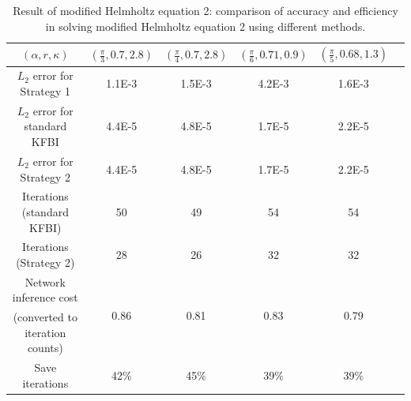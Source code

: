 \documentclass{article}
\begin{document}
\begin{table}[ht]
    \centering
    \begin{tabular}{|c|c|c|c|c|c|} \hline 
         $(\alpha, r, \kappa) $ & $(\frac{\pi}{3}, 0.7, 2.8)$ & $(\frac{\pi}{4}, 0.7, 2.8)$ & $(\frac{\pi}{6}, 0.71, 0.9)$ & $(\frac{\pi}{5}, 0.68, 1.3)$ \\ \hline 
         $L_2$ error for Strategy 1 & 1.1E-3 & 1.5E-3& 4.2E-3 & 1.6E-3 \\ \hline
         $L_{2}$ error for standard KFBI & 4.4E-5 & 4.8E-5 & 1.7E-5 & 2.2E-5 \\ \hline
         $L_{2}$ error for Strategy 2 & 4.4E-5 & 4.8E-5 & 1.7E-5 & 2.2E-5 \\ \hline
         Iterations (standard KFBI) & 50 & 49 & 54 & 54 \\ \hline 
         Iterations (Strategy 2) & 28 & 26 & 32 & 32  \\ \hline 
         
         Network inference cost
         & \multirow{2}{*}{0.86\bigstrut}
         & \multirow{2}{*}{0.81\bigstrut}
         & \multirow{2}{*}{0.83\bigstrut}
         & \multirow{2}{*}{0.79\bigstrut}
         \\
         (converted to iteration counts) & & & &\\ \hline
         
         Save iterations & 42\% & 45\% & 39\% & 39\% \\ \hline
    \end{tabular}
    \caption{Result of modified Helmholtz equation 2: comparison of accuracy and efficiency in solving modified Helmholtz equation 2 using different methods.}
    \label{label_Cont_1}
\end{table}
\end{document}
